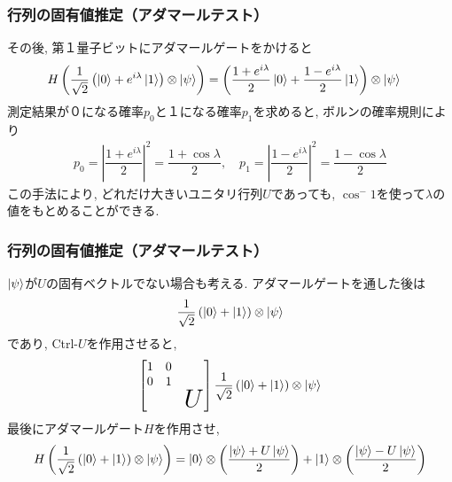 \documentclass[9pt]{beamer}
\begin{document}
\begin{frame}
    \frametitle{行列の固有値推定（アダマールテスト）}
    その後, 第１量子ビットにアダマールゲートをかけると
    \begin{align}
        H\left( \frac{1}{\sqrt{2}} \left( \ket{0} + e^{i\lambda} \ket{1} \right) \otimes \ket{\psi} \right) 
        &= 
        \left( \dfrac{1+e^{i\lambda}}{2} \ket{0} + \dfrac{1-e^{i\lambda}}{2} \ket{1} \right) \otimes \ket{\psi}
    \end{align}
    測定結果が０になる確率$p_0$と１になる確率$p_1$を求めると, ボルンの確率規則により
    \begin{align}
        p_0 = \left| \dfrac{1+e^{i\lambda}}{2} \right|^2 = \dfrac{1+\cos{\lambda}}{2} ,\quad p_1 = \left| \dfrac{1-e^{i\lambda}}{2} \right|^2 = \dfrac{1-\cos{\lambda}}{2}
    \end{align}
    この手法により, どれだけ大きいユニタリ行列$U$であっても, $\cos^-1$を使って$\lambda$の値をもとめることができる.
\end{frame}

\begin{frame}
    \frametitle{行列の固有値推定（アダマールテスト）}
    $\ket{\psi}$が$U$の固有ベクトルでない場合も考える. アダマールゲートを通した後は
    \begin{align}
        \frac{1}{\sqrt{2}} \left( \ket{0} + \ket{1} \right) \otimes \ket{\psi}
    \end{align}
    であり, Ctrl-$U$を作用させると,
    \begin{align}
        \begin{bmatrix}
            1 & 0                 &     \\
            0 & 1                 &     \\
              &                   & \text{\huge{$U$}}
        \end{bmatrix}
        \frac{1}{\sqrt{2}} \left( \ket{0} + \ket{1} \right) \otimes \ket{\psi}
    \end{align}
    最後にアダマールゲート$H$を作用させ,
    \begin{align}
        H \left( \frac{1}{\sqrt{2}} \left( \ket{0} + \ket{1} \right) \otimes \ket{\psi} \right) =
         \ket{0} \otimes \left( \dfrac{\ket{\psi} + U\ket{\psi}}{2} \right) + \ket{1} \otimes \left( \dfrac{\ket{\psi} - U\ket{\psi}}{2} \right)
    \end{align}
\end{frame}
\end{document}
